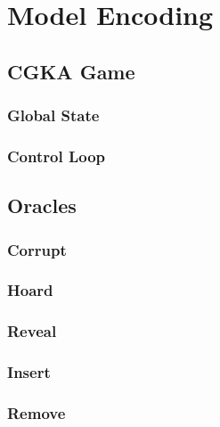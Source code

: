 \hypertarget{sec:model-encoding}{%
\chapter{Model Encoding}\label{sec:model-encoding}}


\hypertarget{sec:game-oracles}{%
\section{CGKA Game}\label{sec:game-oracles}}


\hypertarget{subsec:global-state}{%
\subsection{Global State}\label{subsec:global-state}}


\hypertarget{subsec:control-loop}{%
\subsection{Control Loop}\label{subsec:control-loop}}


\hypertarget{sec:game-oracles}{%
\section{Oracles}\label{sec:game-oracles}}


\hypertarget{corrupt}{%
\subsection{Corrupt}\label{corrupt}}


\hypertarget{hoard}{%
\subsection{Hoard}\label{hoard}}


\hypertarget{reveal}{%
\subsection{Reveal}\label{reveal}}


\hypertarget{insert}{%
\subsection{Insert}\label{insert}}


\hypertarget{remove}{%
\subsection{Remove}\label{remove}}


